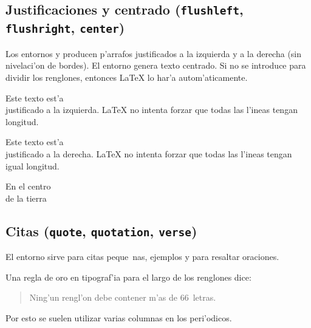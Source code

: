 \subsection{Justificaciones y centrado (\texttt{flushleft},
            \texttt{flushright}, \texttt{center})}

Los entornos  y  producen p'arrafos
justificados a la izquierda y a la derecha (sin nivelaci'on de
bordes).%
 El
entorno  genera texto centrado. Si no se introduce \ci{\bs}
para dividir los renglones, entonces \LaTeX{} lo har'a
autom'aticamente.

\begin{example}
\begin{flushleft}
Este texto est'a\\ justificado a
la izquierda. \LaTeX{} no intenta
forzar que todas las l'ineas
tengan longitud.
\end{flushleft}
\end{example}

\begin{example}
\begin{flushright}
Este texto est'a\\ justificado a
la derecha. \LaTeX{} no intenta
forzar que todas las l'ineas
tengan igual longitud.
\end{flushright}
\end{example}

\begin{example}
\begin{center}
En el centro\\de la tierra
\end{center}
\end{example}

\subsection{Citas (\texttt{quote}, \texttt{quotation}, \texttt{verse})}

El entorno  sirve para citas peque~nas, ejemplos y para
resaltar oraciones.
\begin{example}
Una regla de oro en tipograf'ia
para el largo de los renglones
dice:
\begin{quote}
Ning'un rengl'on debe contener
m'as de 66~letras.
\end{quote}
Por esto se suelen utilizar varias
columnas en los peri'odicos.
\end{example}


